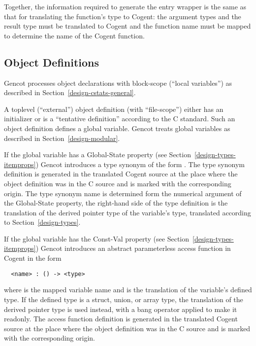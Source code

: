 Together, the information required to generate the entry wrapper is the same as that for translating the 
function's type to Cogent: the argument types and the result type must be translated to Cogent and the
function name must be mapped to determine the name of the Cogent function.

\subsection{Object Definitions}
\label{design-fundefs-object}

Gencot processes object declarations with block-scope (``local variables'') as described in Section~\ref{design-cstats-general}. 

A toplevel (``external'') object definition (with ``file-scope'') either has an initializer or is a ``tentative definition''
according to the C standard. Such an object definition defines a global variable. Gencot treats global variables
as described in Section~\ref{design-modular}.

If the global variable has a Global-State property (see Section~\ref{design-types-itemprops}) Gencot introduces a type 
synonym of the form . The type synonym definition is generated in the translated Cogent source 
at the place where the object definition was in the C source and is marked with the corresponding origin. The 
type synonym name is determined form the numerical argument of the Global-State property, the right-hand side of
the type definition is the translation of the derived pointer type of the variable's type, translated according to
Section~\ref{design-types}.

If the global variable has the Const-Val property (see Section~\ref{design-types-itemprops}) Gencot introduces an abstract 
parameterless access function in Cogent in the form
\begin{verbatim}
  <name> : () -> <type>
\end{verbatim}
where  is the mapped variable name and  is the translation of the variable's defined type.
If the defined type is a struct, union, or array type, the translation of the derived pointer type is used instead,
with a bang operator applied to make it readonly. The access function definition is generated in the translated Cogent source 
at the place where the object definition was in the C source and is marked with the corresponding origin.

